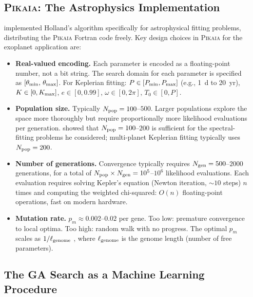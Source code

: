 \documentclass[12pt]{article}
\begin{document}
\subsection{\textsc{Pikaia}: The Astrophysics Implementation}

\citet{Charbonneau1995} implemented Holland's algorithm specifically for
astrophysical fitting problems, distributing the \textsc{Pikaia}
Fortran code freely.  Key design choices in \textsc{Pikaia} for the
exoplanet application are:
\begin{itemize}
  \item \textbf{Real-valued encoding.}  Each parameter is encoded as a
    floating-point number, not a bit string.  The search domain for
    each parameter is specified as $[\theta_{\rm min},\,\theta_{\rm max}]$.
    For Keplerian fitting: $P \in [P_{\rm min}, P_{\rm max}]$
    (e.g., 1~d to 20~yr), $K \in [0, K_{\rm max}]$,
    $e \in [0, 0.99]$, $\omega \in [0, 2\pi]$, $T_0 \in [0, P]$.

  \item \textbf{Population size.}  Typically $N_{\rm pop} = 100$--$500$.
    Larger populations explore the space more thoroughly but require
    proportionally more likelihood evaluations per generation.
    \citet{Charbonneau1995} showed that $N_{\rm pop} = 100$--$200$
    is sufficient for the spectral-fitting problems he considered;
    multi-planet Keplerian fitting typically uses $N_{\rm pop} = 200$.

  \item \textbf{Number of generations.}  Convergence typically requires
    $N_{\rm gen} = 500$--$2000$ generations, for a total of
    $N_{\rm pop} \times N_{\rm gen} = 10^5$--$10^6$ likelihood
    evaluations.  Each evaluation requires solving Kepler's equation
    (Newton iteration, $\sim10$ steps) $n$ times and computing the
    weighted chi-squared: $O(n)$ floating-point operations, fast on
    modern hardware.

  \item \textbf{Mutation rate.}  $p_m \approx 0.002$--$0.02$ per gene.
    Too low: premature convergence to local optima.  Too high:
    random walk with no progress.  The optimal $p_m$ scales as
    $1/\ell_{\rm genome}$ \citep{Holland1975}, where $\ell_{\rm genome}$
    is the genome length (number of free parameters).
\end{itemize}

\subsection{The GA Search as a Machine Learning Procedure}
\end{document}

